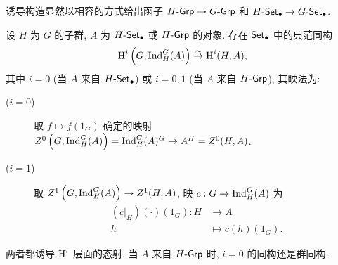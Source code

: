 诱导构造显然以相容的方式给出函子 $H\text{-}\mathsf{Grp} \to G\text{-}\mathsf{Grp}$ 和 $H\text{-}\mathsf{Set}_\bullet \to G\text{-}\mathsf{Set}_\bullet$.

\begin{theorem}\label{prop:Shapiro-noncommutative}
	设 $H$ 为 $G$ 的子群, $A$ 为 $H\text{-}\mathsf{Set}_\bullet$ 或 $H\text{-}\mathsf{Grp}$ 的对象. 存在 $\mathsf{Set}_\bullet$ 中的典范同构
	\[ \operatorname{H}^i\left(G, \operatorname{Ind}^G_H(A)\right) \stackrel{\sim}{\rightarrow} \operatorname{H}^i(H, A), \]
	其中 $i=0$ (当 $A$ 来自 $H\text{-}\mathsf{Set}_\bullet$) 或 $i=0,1$ (当 $A$ 来自 $H\text{-}\mathsf{Grp}$), 其映法为:
	\begin{description}
		\item[($i=0$)] 取 $f \mapsto f(1_G)$ 确定的映射 $Z^0\left(G, \operatorname{Ind}^G_H(A)\right) = \operatorname{Ind}^G_H(A)^G \to A^H = Z^0(H, A)$.
		\item[($i=1$)] 取 $Z^1\left(G, \operatorname{Ind}^G_H(A)\right) \to Z^1(H, A)$, 映 $c: G \to \operatorname{Ind}^G_H(A)$ 为
		\begin{align*}
			(c|_H)(\cdot)(1_G): H & \to A \\
			h & \mapsto c(h)(1_G).
		\end{align*}
	\end{description}
	两者都诱导 $\operatorname{H}^i$ 层面的态射. 当 $A$ 来自 $H\text{-}\mathsf{Grp}$ 时, $i=0$ 的同构还是群同构.
\end{theorem}
